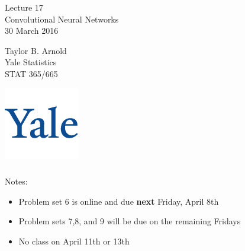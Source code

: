\documentclass[xetex,mathserif,serif,aspectratio=169]{beamer}
\begin{document}
\begin{frame}[fragile] \frametitle{} \oldB \small

\vfill

{\fontsize{0.7cm}{0cm}\selectfont Lecture 17 \\\vspace{0.2cm}
Convolutional Neural Networks}\\\vspace{0.5cm}
30 March 2016

\vspace{2cm}

\begin{minipage}{0.6\textwidth}
Taylor B. Arnold \\
Yale Statistics \\
STAT 365/665
\end{minipage}
\hfill
\begin{minipage}{0.3\textwidth}\raggedleft
\includegraphics[scale=0.3]{../yale-logo.png}
\end{minipage}%

\end{frame}

\begin{frame}[fragile] \frametitle{} \oldB \small

Notes:
\begin{itemize}
\item Problem set 6 is online and due \textbf{next} Friday, April 8th
\item Problem sets 7,8, and 9 will be due on the remaining Fridays
\item No class on April 11th or 13th
\end{itemize}

\end{frame}
\end{document}

